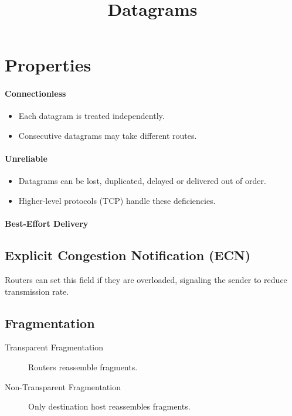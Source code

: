 \documentclass{article}
\title{Datagrams}
\begin{document}
\maketitle

\section*{Properties}
\paragraph*{Connectionless}
\begin{itemize}
    \item Each datagram is treated independently.
    \item Consecutive datagrams may take different routes.
\end{itemize}
\paragraph*{Unreliable}
\begin{itemize}
    \item Datagrams can be lost, duplicated, delayed or delivered out of order.
    \item Higher-level protocols (TCP) handle these deficiencies.
\end{itemize}
\paragraph*{Best-Effort Delivery}

\subsection*{Explicit Congestion Notification (ECN)}
Routers can set this field if they are overloaded, signaling the sender to
reduce transmission rate.

\subsection*{Fragmentation}
\begin{description}
    \item[Transparent Fragmentation] Routers reassemble fragments.
    \item[Non-Transparent Fragmentation] Only destination host reassembles fragments.
\end{description}
\end{document}
